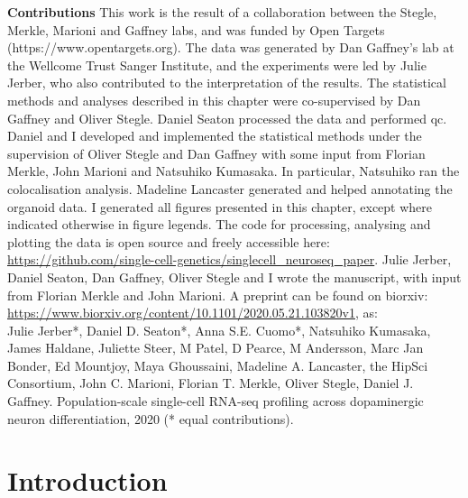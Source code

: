 \newpage

\begin{Comment2}

\hspace{-3mm}\textbf{Contributions} This work is the result of a collaboration between the Stegle, Merkle, Marioni and Gaffney labs, and was funded by Open Targets 
(https://www.opentargets.org).
The data was generated by Dan Gaffney’s lab at the Wellcome Trust Sanger Institute, and the experiments were led by Julie Jerber, who also contributed to the interpretation of the results. 
The statistical methods and analyses described in this chapter were co-supervised by Dan Gaffney and Oliver Stegle. 
Daniel Seaton processed the data and performed \gls{qc}. 
Daniel and I developed and implemented the statistical methods under the supervision of Oliver Stegle and Dan Gaffney with some input from Florian Merkle, John Marioni and Natsuhiko Kumasaka.
In particular, Natsuhiko ran the colocalisation analysis.
Madeline Lancaster generated and helped annotating the organoid data.
I generated all figures presented in this chapter, except where indicated otherwise in figure legends. 
The code for processing, analysing and plotting the data is open source and freely accessible here: \url{https://github.com/single-cell-genetics/singlecell\_neuroseq\_paper}.
Julie Jerber, Daniel Seaton, Dan Gaffney, Oliver Stegle and I wrote the manuscript, with input from Florian Merkle and John Marioni.
A preprint \cite{jerber2020population} can be found on biorxiv: \url{https://www.biorxiv.org/content/10.1101/2020.05.21.103820v1}, as:\\

Julie Jerber*, Daniel D. Seaton*, Anna S.E. Cuomo*, Natsuhiko Kumasaka, James Haldane, Juliette Steer, M Patel, D Pearce, M Andersson, Marc Jan Bonder, Ed Mountjoy, Maya Ghoussaini, Madeline A. Lancaster, the HipSci Consortium, John C. Marioni, Florian T. Merkle, Oliver Stegle, Daniel J. Gaffney. Population-scale single-cell RNA-seq profiling across dopaminergic neuron differentiation, 2020 (* equal contributions).

\end{Comment2}

\newpage

\section{Introduction}
\label{sec:neuroseq_intro}

